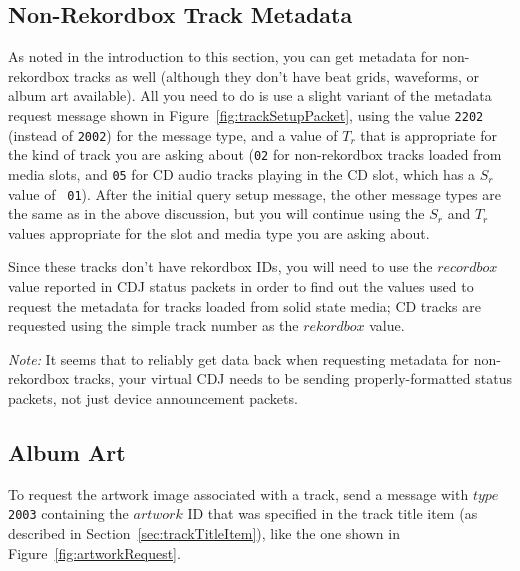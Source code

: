 \documentclass[11pt]{article}
\begin{document}
\subsection{Non-Rekordbox Track Metadata}
\label{sec:nonRekordboxMetadata}

As noted in the introduction to this section, you can get metadata for
non-rekordbox tracks as well (although they don't have beat grids,
waveforms, or album art available). All you need to do is use a slight
variant of the metadata request message shown in
Figure~\ref{fig:trackSetupPacket}, using the value {\tt 2202} (instead
of {\tt 2002}) for the message type, and a value of $T_r$ that is
appropriate for the kind of track you are asking about ({\tt 02} for
non-rekordbox tracks loaded from media slots, and {\tt 05} for CD
audio tracks playing in the CD slot, which has a $S_r$ value of {\tt
  01}). After the initial query setup message, the other message types
are the same as in the above discussion, but you will continue using
the $S_r$ and $T_r$ values appropriate for the slot and media type you
are asking about.

Since these tracks don't have rekordbox IDs, you will need to use the
$recordbox$ value reported in CDJ status packets in order to find out
the values used to request the metadata for tracks loaded from solid
state media; CD tracks are requested using the simple track number as
the $rekordbox$ value.

\emph{Note:} It seems that to reliably get data back when requesting
metadata for non-rekordbox tracks, your virtual CDJ needs to be
sending properly-formatted status packets, not just device
announcement packets.

\subsection{Album Art}
\label{sec:albumArt}

To request the artwork image associated with a track, send a message
with $type$ {\tt 2003} containing the $artwork$ ID that was
specified in the track title item (as described in
Section~\ref{sec:trackTitleItem}), like the one shown in
Figure~\ref{fig:artworkRequest}.
\end{document}
